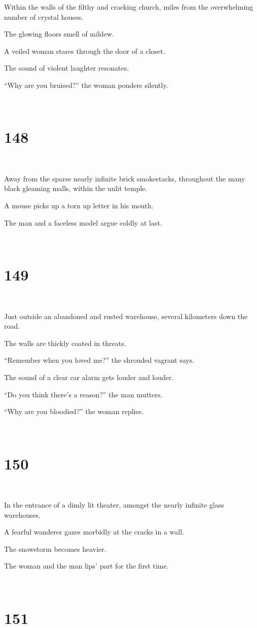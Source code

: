 \documentclass{report}
\begin{document}
Within the walls of the filthy and cracking church, miles from the overwhelming number of crystal houses.

The glowing floors smell of mildew.

A veiled woman stares through the door of a closet.

The sound of violent laughter resonates.

``Why are you bruised?'' the woman ponders silently.

~
\chapter*{148}
~

Away from the sparse nearly infinite brick smokestacks, throughout the many black gleaming malls, within the unlit temple.

A mouse picks up a torn up letter in his mouth.

The man and a faceless model argue coldly at last.

~
\chapter*{149}
~

Just outside an abandoned and rusted warehouse, several kilometers down the road.

The walls are thickly coated in threats.

``Remember when you loved me?'' the shrouded vagrant says.

The sound of a clear car alarm gets louder and louder.

``Do you think there's a reason?'' the man mutters.

``Why are you bloodied?'' the woman replies.

~
\chapter*{150}
~

In the entrance of a dimly lit theater, amongst the nearly infinite glass warehouses.

A fearful wanderer gazes morbidly at the cracks in a wall.

The snowstorm becomes heavier.

The woman and the man lips' part for the first time.

~
\chapter*{151}
~
\end{document}
